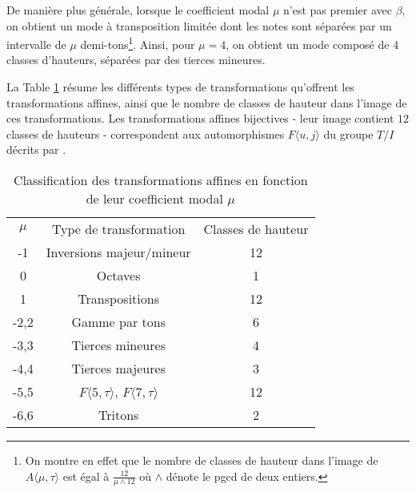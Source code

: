 De manière plus générale, lorsque le coefficient modal $\mu$ n'est pas premier avec $\beta$, on obtient un mode à transposition limitée dont les notes sont séparées par un intervalle de $\mu$ demi-tons\footnote{On montre en effet que le nombre de classes de hauteur dans l'image de $A\langle \mu, \tau\rangle$ est égal à $\frac{12}{\mu\wedge 12}$ où $\wedge$ dénote le pgcd de deux entiers.}. Ainsi, pour $\mu = 4$, on obtient un mode composé de $4$ classes d'hauteurs, séparées par des tierces mineures.


La Table \ref{tab:classmu} résume les différents types de transformations qu'offrent les transformations affines, ainsi que le nombre de classes de hauteur dans l'image de ces transformations. Les transformations affines bijectives - leur image contient $12$ classes de hauteurs - correspondent  aux automorphismes $F\langle u,j \rangle$ du groupe $T/I$ décrits par \cite{lewin1990klumpenhouwer}.


\begin{table}[htbp]
  \centering
  \begin{tabular}{ccc}
    \rowcolor{gray!50}
    $\mu$ & Type de transformation & Classes de hauteur\\
    -1 & Inversions majeur/mineur & 12\\
    0 & Octaves & 1\\
    1 & Transpositions & 12 \\
    -2,2 & Gamme par tons & 6 \\
    -3,3 & Tierces mineures &4 \\
    -4,4 & Tierces majeures & 3\\
    -5,5 & $F\langle 5,\tau \rangle$, $F\langle 7,\tau \rangle$& 12 \\
    -6,6 & Tritons & 2\\
  \end{tabular}
  \caption{Classification des transformations affines en fonction de leur coefficient modal $\mu$\label{tab:classmu} } 
\end{table}
